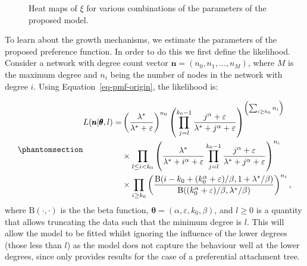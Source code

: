 \documentclass[
  sn-basic,
  10pt,
]{sn-jnl}
\theoremstyle{thmstyleone}
\theoremstyle{thmstyleone}
\theoremstyle{remark}
\theoremstyle{plain}
\theoremstyle{plain}
\theoremstyle{remark}
\begin{document}
\begin{figure}


\caption{\label{fig-polyheat}Heat maps of \(\xi\) for various
combinations of the parameters of the proposed model.}

\end{figure}%

\newpage

To learn about the growth mechanisms, we estimate the parameters of the
proposed preference function. In order to do this we first define the
likelihood. Consider a network with degree count vector
\(\pmb n = (n_0, n_1, \ldots, n_M)\), where \(M\) is the maximum degree
and \(n_i\) being the number of nodes in the network with degree \(i\).
Using Equation~\ref{eq-pmf-origin}, the likelihood is:

\begin{equation}\phantomsection\label{eq-llh}{
\begin{aligned}
L(\pmb n | \pmb \theta,l) = &\left(\frac{\lambda^*}{\lambda^*+\varepsilon}\right)^{n_0}\left(\prod_{j=l}^{k_0-1}\frac{j^\alpha +\varepsilon}{\lambda^* + j^\alpha +\varepsilon}\right)^{\left(\sum_{i\ge k_0}n_{i}\right)} \\ &\times \prod_{l \le i<k_0}\left(\frac{\lambda^*}{\lambda^* +i^\alpha + \varepsilon } \prod_{j=l}^{k_0-1}\frac{j^\alpha + \varepsilon}{\lambda^* + j^\alpha + \varepsilon}\right)^{n_i}\\ &\times \prod_{i\ge k_0}\left(\frac{\text{B}(i-k_0 + (k_0^\alpha + \varepsilon)/\beta,1+\lambda^*/\beta)}{\text{B}((k_0^\alpha + \varepsilon)/\beta,\lambda^*/\beta)}\right)^{n_i},
\end{aligned}
}\end{equation} where \(\text{B}(\cdot,\cdot)\) is the the beta
function, \(\pmb \theta = (\alpha, \varepsilon, k_0,\beta)\), and
\(l\ge0\) is a quantity that allows truncating the data such that the
minimum degree is \(l\). This will allow the model to be fitted whilst
ignoring the influence of the lower degrees (those less than \(l\)) as
the model does not capture the behaviour well at the lower degrees,
since \citet{rudas07} only provides results for the case of a
preferential attachment tree.
\end{document}
